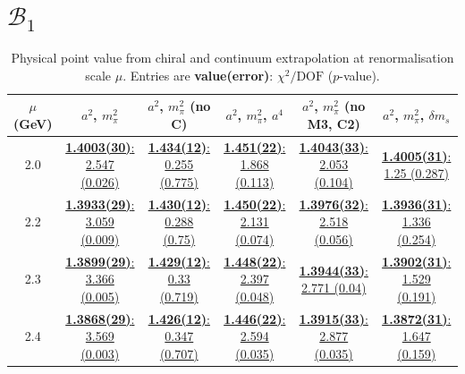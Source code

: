 \documentclass[12pt]{extarticle}
\begin{document}
\clearpage
\section{$\mathcal{B}_1$}
\begin{table}[h!]
\begin{center}
\begin{tabular}{|c|c|c|c|c|c|}
\hline
$\mu$ (GeV) & $a^2$, $m_\pi^2$& $a^2$, $m_\pi^2$ (no C)& $a^2$, $m_\pi^2$, $a^4$& $a^2$, $m_\pi^2$ (no M3, C2)& $a^2$, $m_\pi^2$, $\delta m_s$\\
\hline
2.0& \hyperlink{VVpAA/SUSY/bag_a2m2_20.pdf.1}{\textbf{1.4003(30)}: 2.547 (0.026)} & \hyperlink{VVpAA/SUSY/bag_a2m2noC_20.pdf.1}{\textbf{1.434(12)}: 0.255 (0.775)} & \hyperlink{VVpAA/SUSY/bag_a2a4m2_20.pdf.1}{\textbf{1.451(22)}: 1.868 (0.113)} & \hyperlink{VVpAA/SUSY/bag_a2m2mcut_20.pdf.1}{\textbf{1.4043(33)}: 2.053 (0.104)} & \hyperlink{VVpAA/SUSY/bag_a2m2delm_20.pdf.1}{\textbf{1.4005(31)}: 1.25 (0.287)}\\
2.2& \hyperlink{VVpAA/SUSY/bag_a2m2_22.pdf.1}{\textbf{1.3933(29)}: 3.059 (0.009)} & \hyperlink{VVpAA/SUSY/bag_a2m2noC_22.pdf.1}{\textbf{1.430(12)}: 0.288 (0.75)} & \hyperlink{VVpAA/SUSY/bag_a2a4m2_22.pdf.1}{\textbf{1.450(22)}: 2.131 (0.074)} & \hyperlink{VVpAA/SUSY/bag_a2m2mcut_22.pdf.1}{\textbf{1.3976(32)}: 2.518 (0.056)} & \hyperlink{VVpAA/SUSY/bag_a2m2delm_22.pdf.1}{\textbf{1.3936(31)}: 1.336 (0.254)}\\
2.3& \hyperlink{VVpAA/SUSY/bag_a2m2_23.pdf.1}{\textbf{1.3899(29)}: 3.366 (0.005)} & \hyperlink{VVpAA/SUSY/bag_a2m2noC_23.pdf.1}{\textbf{1.429(12)}: 0.33 (0.719)} & \hyperlink{VVpAA/SUSY/bag_a2a4m2_23.pdf.1}{\textbf{1.448(22)}: 2.397 (0.048)} & \hyperlink{VVpAA/SUSY/bag_a2m2mcut_23.pdf.1}{\textbf{1.3944(33)}: 2.771 (0.04)} & \hyperlink{VVpAA/SUSY/bag_a2m2delm_23.pdf.1}{\textbf{1.3902(31)}: 1.529 (0.191)}\\
2.4& \hyperlink{VVpAA/SUSY/bag_a2m2_24.pdf.1}{\textbf{1.3868(29)}: 3.569 (0.003)} & \hyperlink{VVpAA/SUSY/bag_a2m2noC_24.pdf.1}{\textbf{1.426(12)}: 0.347 (0.707)} & \hyperlink{VVpAA/SUSY/bag_a2a4m2_24.pdf.1}{\textbf{1.446(22)}: 2.594 (0.035)} & \hyperlink{VVpAA/SUSY/bag_a2m2mcut_24.pdf.1}{\textbf{1.3915(33)}: 2.877 (0.035)} & \hyperlink{VVpAA/SUSY/bag_a2m2delm_24.pdf.1}{\textbf{1.3872(31)}: 1.647 (0.159)}\\
\hline
\end{tabular}
\caption{Physical point value from chiral and continuum extrapolation at renormalisation scale $\mu$. Entries are \textbf{value(error)}: $\chi^2/\text{DOF}$ ($p$-value).}
\end{center}
\end{table}
\end{document}
